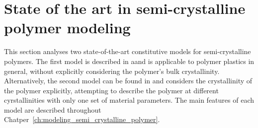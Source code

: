
\section{State of the art in semi-crystalline polymer modeling}

This section analyses two state-of-the-art constitutive models for semi-crystalline polymers.
The first model is described in \cite{haoUnifiedAmorphousCrystalline2022} aand is applicable to polymer plastics in general, without explicitly considering the polymer's bulk crystallinity.
Alternatively, the second model can be found in \cite{abdul-hameedTwophaseHyperelasticviscoplasticConstitutive2014} and considers the crystallinity of the polymer explicitly, attempting to describe the polymer at different cyrstallinities with only one set of material parameters.
The main features of each model are described throughout Chatper~\ref{ch:modeling_semi_crystalline_polymer}.

